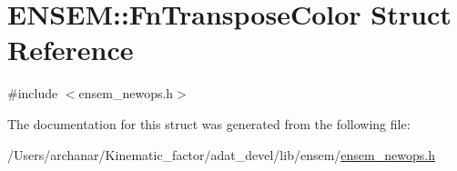 \hypertarget{structENSEM_1_1FnTransposeColor}{}\section{E\+N\+S\+EM\+:\+:Fn\+Transpose\+Color Struct Reference}
\label{structENSEM_1_1FnTransposeColor}


{\ttfamily \#include $<$ensem\+\_\+newops.\+h$>$}



The documentation for this struct was generated from the following file\+:\begin{DoxyCompactItemize}
\item 
/\+Users/archanar/\+Kinematic\+\_\+factor/adat\+\_\+devel/lib/ensem/\mbox{\hyperlink{lib_2ensem_2ensem__newops_8h}{ensem\+\_\+newops.\+h}}\end{DoxyCompactItemize}

